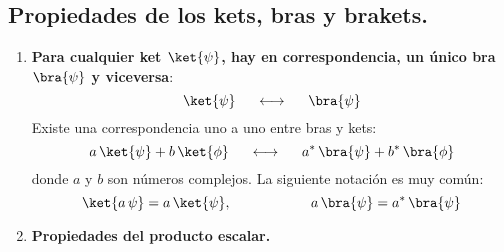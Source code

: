 \subsection*{Propiedades de los kets, bras y brakets.}
\begin{enumerate}[label=\alph*)]
\item \textbf{Para cualquier ket $\ket{\psi}$, hay en correspondencia, un único bra $\bra{\psi}$ y viceversa}:
\begin{equation}
\ket{\psi} \hspace{0.5cm} \longleftrightarrow \hspace{0.5cm} \bra{\psi}
\label{eq:ecuacion_02_26}
\end{equation}
Existe una correspondencia uno a uno entre bras y kets:
\begin{equation}
a \, \ket{\psi} + b \, \ket{\phi} \hspace{0.5cm} \longleftrightarrow \hspace{0.5cm} a^{*} \, \bra{\psi}
+ b^{*} \, \bra{\phi} \label{eq:ecuacion_02_27}
\end{equation}
donde $a$ y $b$ son números complejos. La siguiente notación es muy común:
\begin{equation}
\ket{a \, \psi} =  a \, \ket{\psi}, \hspace{2cm} a \, \bra{\psi} = a^{*} \, \bra{\psi}
\label{eq:ecuacion_02_28}
\end{equation}
\item \textbf{Propiedades del producto escalar.}


\end{enumerate}
